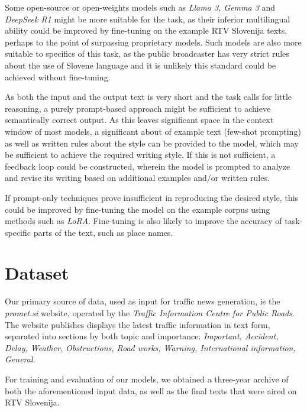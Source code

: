 \documentclass[fleqn,moreauthors,10pt]{ds_report}
\begin{document}
Some open-source or open-weights models such as \textit{Llama 3, Gemma 3} and \textit{DeepSeek R1} might be more suitable for the task, as their inferior multilingual ability could be improved by fine-tuning on the example RTV Slovenija texts, perhaps to the point of surpassing proprietary models. Such models are also more suitable to specifics of this task, as the public broadcaster has very strict rules about the use of Slovene language and it is unlikely this standard could be achieved without fine-tuning.

As both the input and the output text is very short and the task calls for little reasoning, a purely prompt-based approach might be sufficient to achieve semantically correct output. As this leaves significant space in the context window of most models, a significant about of example text (few-shot prompting) as well as written rules about the style can be provided to the model, which may be sufficient to achieve the required writing style. If this is not sufficient, a feedback loop could be constructed, wherein the model is prompted to analyze and revise its writing based on additional examples and/or written rules.

If prompt-only techniques prove insufficient in reproducing the desired style, this could be improved by fine-tuning the model on the example corpus using methods such as \textit{LoRA}. Fine-tuning is also likely to improve the accuracy of task-specific parts of the text, such as place names.


\section*{Dataset}

Our primary source of data, used as input for traffic news generation, is the \textit{promet.si} website, operated by the \textit{Traffic Information Centre for Public Roads}. The website publishes displays the latest traffic information in text form, separated into sections by both topic and importance: \textit{Important, Accident, Delay, Weather, Obstructions, Road works, Warning, International information, General}.

For training and evaluation of our models, we obtained a three-year archive of both the aforementioned input data, as well as the final texts that were aired on RTV Slovenija.

\end{document}

